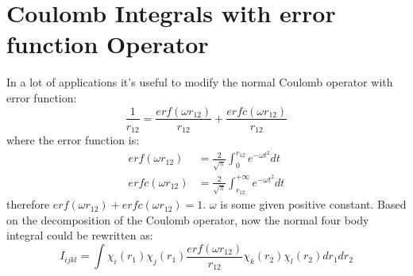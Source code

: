 
\section{Coulomb Integrals with error function Operator}

In a lot of applications it's useful to modify the normal Coulomb operator with 
error function:
\begin{equation}\label{erf_coulomb_integral:1}
 \frac{1}{r_{12}} = \frac{erf(\omega r_{12})}{r_{12}} + \frac{erfc(\omega r_{12})}{r_{12}}
\end{equation}
where the error function is:
\begin{align}\label{erf_coulomb_integral:2}
 erf(\omega r_{12})  &= \frac{2}{\sqrt{\pi}}\int_{0}^{r_{12}} e^{-\omega t^{2}} dt \nonumber \\ 
 erfc(\omega r_{12}) &= \frac{2}{\sqrt{\pi}}\int_{r_{12}}^{+\infty} e^{-\omega t^{2}} dt
\end{align}
therefore $erf(\omega r_{12}) + erfc(\omega r_{12}) = 1$. $\omega$ is some given positive
constant. Based on the decomposition of the Coulomb operator, now the normal four body 
integral could be rewritten as:
\begin{equation}\label{erf_coulomb_integral:3}
 I_{ijkl} = \int \chi_{i}(r_{1})\chi_{j}(r_{1})\frac{erf(\omega r_{12})}{r_{12}}
\chi_{k}(r_{2})\chi_{l}(r_{2}) dr_{1} dr_{2}
\end{equation}

